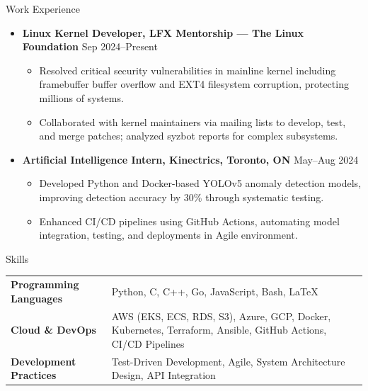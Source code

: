 \documentclass{resume} %
\begin{document}
\begin{rSection}{Work Experience}
\begin{itemize}[left=0pt,itemsep=0pt]
  \item \textbf{Linux Kernel Developer, LFX Mentorship — The Linux Foundation} \hfill Sep 2024–Present
        \begin{itemize}[nosep,itemsep=0pt,leftmargin=1em]
            \item Resolved critical security vulnerabilities in mainline kernel including framebuffer buffer overflow and EXT4 filesystem corruption, protecting millions of systems.
            \item Collaborated with kernel maintainers via mailing lists to develop, test, and merge patches; analyzed syzbot reports for complex subsystems.
        \end{itemize}
  \item \textbf{Artificial Intelligence Intern, Kinectrics, Toronto, ON} \hfill May–Aug 2024
        \begin{itemize}[nosep,itemsep=0pt,leftmargin=1em]
            \item Developed Python and Docker-based YOLOv5 anomaly detection models, improving detection accuracy by 30\% through systematic testing.
            \item Enhanced CI/CD pipelines using GitHub Actions, automating model integration, testing, and deployments in Agile environment.
        \end{itemize}
\end{itemize}
\end{rSection}

\begin{rSection}{Skills}
\begin{tabular}{ @{} >{\bfseries}l @{} p{4.2in} }
Programming Languages & Python, C, C++, Go, JavaScript, Bash, \LaTeX \\
Cloud \& DevOps & AWS (EKS, ECS, RDS, S3), Azure, GCP, Docker, Kubernetes, Terraform, Ansible, GitHub Actions, CI/CD Pipelines \\
Development Practices & Test-Driven Development, Agile, System Architecture Design, API Integration \\
\end{tabular}
\end{rSection}
\end{document}
